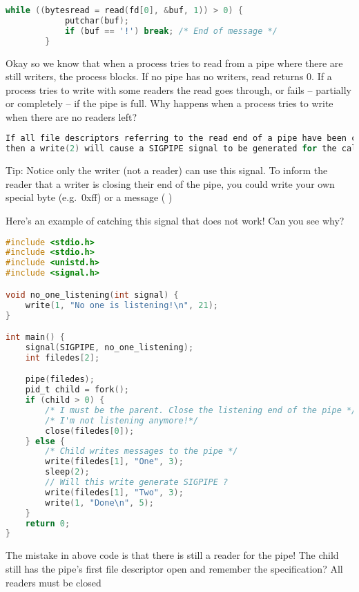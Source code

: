 \begin{lstlisting}[language=C]
        while ((bytesread = read(fd[0], &buf, 1)) > 0) {
            putchar(buf);
            if (buf == '!') break; /* End of message */
        }
\end{lstlisting}


Okay so we know that when a process tries to read from a pipe where there are still writers, the process blocks.
If no pipe has no writers, read returns 0.
If a process tries to write with some readers the read goes through, or fails -- partially or completely -- if the pipe is full.
Why happens when a process tries to write when there are no readers left?

\begin{lstlisting}[language=C]
If all file descriptors referring to the read end of a pipe have been closed,
then a write(2) will cause a SIGPIPE signal to be generated for the calling process.
\end{lstlisting}

Tip: Notice only the writer (not a reader) can use this signal. To
inform the reader that a writer is closing their end of the pipe, you
could write your own special byte (e.g.~0xff) or a message (
)

Here's an example of catching this signal that does not work! Can you see why?

\begin{lstlisting}[language=C]
#include <stdio.h>
#include <stdio.h>
#include <unistd.h>
#include <signal.h>

void no_one_listening(int signal) {
    write(1, "No one is listening!\n", 21);
}

int main() {
    signal(SIGPIPE, no_one_listening);
    int filedes[2];

    pipe(filedes);
    pid_t child = fork();
    if (child > 0) {
        /* I must be the parent. Close the listening end of the pipe */
        /* I'm not listening anymore!*/
        close(filedes[0]);
    } else {
        /* Child writes messages to the pipe */
        write(filedes[1], "One", 3);
        sleep(2);
        // Will this write generate SIGPIPE ?
        write(filedes[1], "Two", 3);
        write(1, "Done\n", 5);
    }
    return 0;
}
\end{lstlisting}

The mistake in above code is that there is still a reader for the pipe!
The child still has the pipe's first file descriptor open and remember the specification? All readers must be closed

